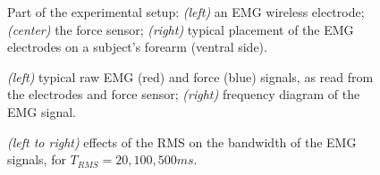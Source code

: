 \documentclass[10pt]{bmc_article}
\def\texttt{[image: ]}
\newenvironment{bmcformat}
  {\begin{raggedright}\baselineskip20pt\sloppy\setboolean{publ}{false}}
  {\end{raggedright}\baselineskip20pt\sloppy}
\begin{document}
\begin{bmcformat}
\begin{figure}[!ht] \centering
  \caption{Part of the experimental setup: \emph{(left)} an EMG
    wireless electrode; \emph{(center)} the force sensor; \emph{(right)} typical
    placement of the EMG electrodes on a subject's forearm (ventral side).}
  \label{fig:SubjSetup}
\end{figure}


\begin{figure}[!ht] \centering
  \caption{\emph{(left)} typical raw EMG (red) and force (blue) signals, as read from the
    electrodes and force sensor; \emph{(right)} frequency diagram of the EMG signal.}
  \label{fig:spectra}
\end{figure}

\begin{figure}[!ht] \centering
  \caption{\emph{(left to right)} effects of the RMS on the bandwidth of the EMG
    signals, for $T_{RMS} = 20, 100, 500ms$.}
  \label{fig:RMSs}
\end{figure}


\end{bmcformat}
\end{document}

